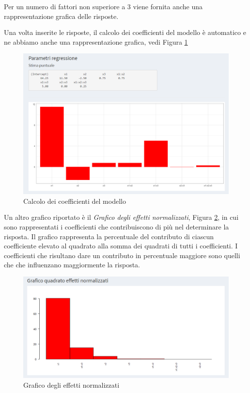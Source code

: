 \documentclass[
  11pt,
]{book}
\begin{document}
Per un numero di fattori non superiore a 3 viene fornita anche una
rappresentazione grafica delle risposte.

Una volta inserite le risposte, il calcolo dei coefficienti del modello
è automatico e ne abbiamo anche una rappresentazione grafica, vedi
Figura \ref{fig:fc6}

\begin{figure}

{\centering \includegraphics[width=1\linewidth]{Immagini/Fatt_compl/06_coeff} 

}

\caption{Calcolo dei coefficienti del modello}\label{fig:fc6}
\end{figure}

Un altro grafico riportato è il \emph{Grafico degli effetti normalizzati},
Figura \ref{fig:fc7}, in cui sono rappresentati i coefficienti che
contribuiscono di più nel determinare la risposta. Il grafico
rappresenta la percentuale del contributo di ciascun coefficiente
elevato al quadrato alla somma dei quadrati di tutti i coefficienti. I
coefficienti che risultano dare un contributo in percentuale maggiore
sono quelli che che influenzano maggiormente la risposta.

\begin{figure}

{\centering \includegraphics[width=1\linewidth]{Immagini/Fatt_compl/07_coeff_norm} 

}

\caption{Grafico degli effetti normalizzati}\label{fig:fc7}
\end{figure}
\end{document}
